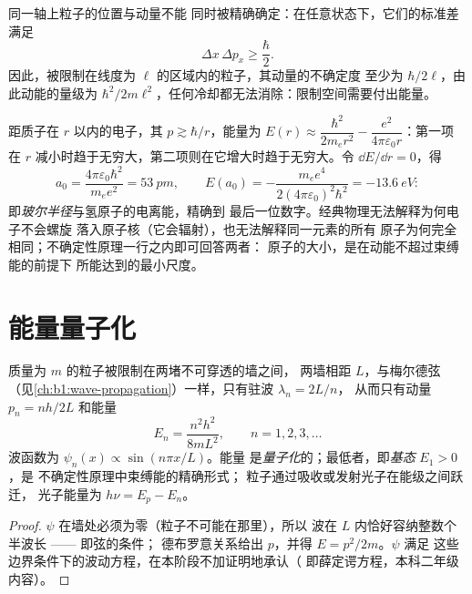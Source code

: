 \begin{theorem}[海森堡不确定性原理]\label{thm:b1:quantum-introduction:heisenberg}
同一轴上粒子的位置与动量不能
同时被精确确定：在任意状态下，它们的标准差满足
\[
\Delta x\,\Delta p_x \geq \frac{\hbar}{2} .
\]
因此，被限制在线度为 $\ell$ 的区域内的粒子，其动量的不确定度
至少为 $\hbar/2\ell$，由此动能的量级为
$\hbar^2/2m\ell^2$，任何冷却都无法消除：限制空间需要付出能量。
\end{theorem}
\admitted

\begin{example}[氢原子的大小]\label{ex:b1:quantum-introduction:hsize}
距质子在 $r$ 以内的电子，其 $p \gtrsim \hbar/r$，能量为
$E(r) \approx \dfrac{\hbar^2}{2m_er^2} - \dfrac{e^2}{4\pi\varepsilon_0r}$：第一项
在 $r$ 减小时趋于无穷大，第二项则在它增大时趋于无穷大。令 $\dd E/\dd r = 0$，得
\[
a_0 = \frac{4\pi\varepsilon_0\hbar^2}{m_ee^2} = \qty{53}{pm} , \qquad
E(a_0) = -\frac{m_ee^4}{2(4\pi\varepsilon_0)^2\hbar^2} = \qty{-13.6}{eV} :
\]
即\emph{玻尔半径}与氢原子的电离能，精确到
最后一位数字。经典物理无法解释为何电子不会螺旋
落入原子核（它会辐射），也无法解释同一元素的所有
原子为何完全相同；不确定性原理一行之内即可回答两者：
原子的大小，是在动能不超过束缚能的前提下
所能达到的最小尺度。
\end{example}

\section{能量量子化}

\begin{proposition}[箱中粒子]\label{prop:b1:quantum-introduction:box}
质量为 $m$ 的粒子被限制在两堵不可穿透的墙之间，
两墙相距 $L$，与梅尔德弦
（见\cref{ch:b1:wave-propagation}）一样，只有驻波 $\lambda_n = 2L/n$，
从而只有动量 $p_n = nh/2L$ 和能量
\[
E_n = \frac{n^2h^2}{8mL^2} , \qquad n = 1, 2, 3, \ldots
\]
波函数为 $\psi_n(x) \propto \sin(n\pi x/L)$。能量
是\emph{量子化}的；最低者，即\emph{基态} $E_1 > 0$，是
不确定性原理中束缚能的精确形式；
粒子通过吸收或发射光子在能级之间跃迁，
光子能量为 $h\nu = E_p - E_n$。
\end{proposition}

\begin{proof}
$\psi$ 在墙处必须为零（粒子不可能在那里），所以
波在 $L$ 内恰好容纳整数个半波长 —— 即弦的条件；
德布罗意关系给出 $p$，并得 $E = p^2/2m$。$\psi$ 满足
这些边界条件下的波动方程，在本阶段不加证明地承认（
即薛定谔方程，本科二年级内容）。
\end{proof}

